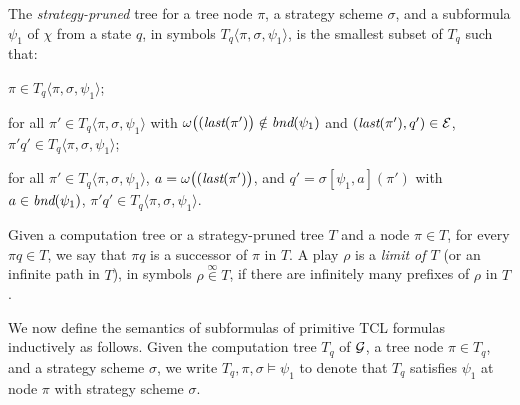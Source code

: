 The {\em strategy-pruned} tree for a tree node $\pi$, 
a strategy scheme $\sigma$,
and a subformula $\psi_1$ of $\chi$ from a state $q$, 
in symbols $T_q\langle\pi,\sigma,\psi_1\rangle$, 
is the smallest subset of $T_q$ such that: 
\begin{list1} 
\item $\pi\in T_q\langle\pi,\sigma,\psi_1\rangle$;  
\item for all $\pi' \in T_q\langle\pi,\sigma,\psi_1\rangle$ 
  with $\omega\big((\textit{last}(\pi')\big)\notin\textit{bnd}(\psi_1)$ 
  and $(\textit{last}(\pi'),q')\in {\cal E}$, 
  $\pi' q'\in T_q\langle\pi,\sigma,\psi_1\rangle$;  
\item for all $\pi' \in T_q\langle\pi,\sigma,\psi_1\rangle$,  
  $a=\omega\big((\textit{last}(\pi')\big)$, and 
  $q'=\sigma[\psi_1,a](\pi')$ 
  with $a\in\textit{bnd}(\psi_1)$, 
  $\pi' q' \in T_q\langle\pi,\sigma,\psi_1\rangle$.
\end{list1}
Given a computation tree or a strategy-pruned tree $T$ and a node $\pi\in T$, 
for every $\pi q\in T$, we say that $\pi q$ is a successor of $\pi$ in $T$. 
A play $\rho$ is a \emph{limit of $T$} (or an infinite path in $T$), in symbols $\rho\stackrel{\infty}\in T$, 
if there are infinitely many prefixes of $\rho$ in $T$. 


We now define the semantics of subformulas of primitive TCL formulas 
inductively as follows.  
Given the computation tree $T_q$ of ${\cal G}$, a tree node $\pi\in T_q$, 
and a strategy scheme $\sigma$, 
we write $T_q,\pi,\sigma\models\psi_1$ to denote that 
$T_q$ satisfies $\psi_1$ at node $\pi$ with strategy scheme $\sigma$.

